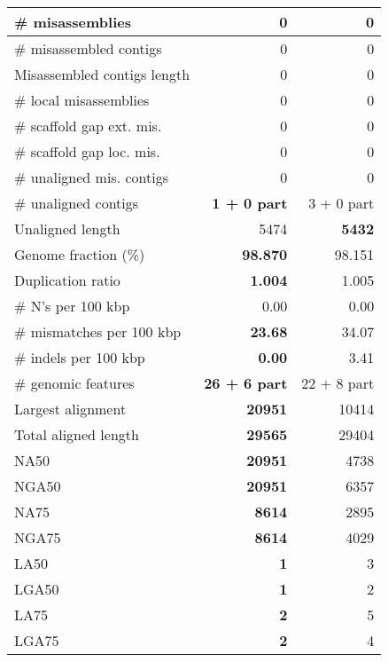 \documentclass[12pt,a4paper]{article}
\begin{document}
\begin{table}[ht]
\begin{center}
\begin{tabular}{|l*{2}{|r}|}
\# misassemblies & 0 & 0 \\ \hline
\# misassembled contigs & 0 & 0 \\ \hline
Misassembled contigs length & 0 & 0 \\ \hline
\# local misassemblies & 0 & 0 \\ \hline
\# scaffold gap ext. mis. & 0 & 0 \\ \hline
\# scaffold gap loc. mis. & 0 & 0 \\ \hline
\# unaligned mis. contigs & 0 & 0 \\ \hline
\# unaligned contigs & {\bf 1 + 0 part} & 3 + 0 part \\ \hline
Unaligned length & 5474 & {\bf 5432} \\ \hline
Genome fraction (\%) & {\bf 98.870} & 98.151 \\ \hline
Duplication ratio & {\bf 1.004} & 1.005 \\ \hline
\# N's per 100 kbp & 0.00 & 0.00 \\ \hline
\# mismatches per 100 kbp & {\bf 23.68} & 34.07 \\ \hline
\# indels per 100 kbp & {\bf 0.00} & 3.41 \\ \hline
\# genomic features & {\bf 26 + 6 part} & 22 + 8 part \\ \hline
Largest alignment & {\bf 20951} & 10414 \\ \hline
Total aligned length & {\bf 29565} & 29404 \\ \hline
NA50 & {\bf 20951} & 4738 \\ \hline
NGA50 & {\bf 20951} & 6357 \\ \hline
NA75 & {\bf 8614} & 2895 \\ \hline
NGA75 & {\bf 8614} & 4029 \\ \hline
LA50 & {\bf 1} & 3 \\ \hline
LGA50 & {\bf 1} & 2 \\ \hline
LA75 & {\bf 2} & 5 \\ \hline
LGA75 & {\bf 2} & 4 \\ \hline
\end{tabular}
\end{center}
\end{table}
\end{document}
